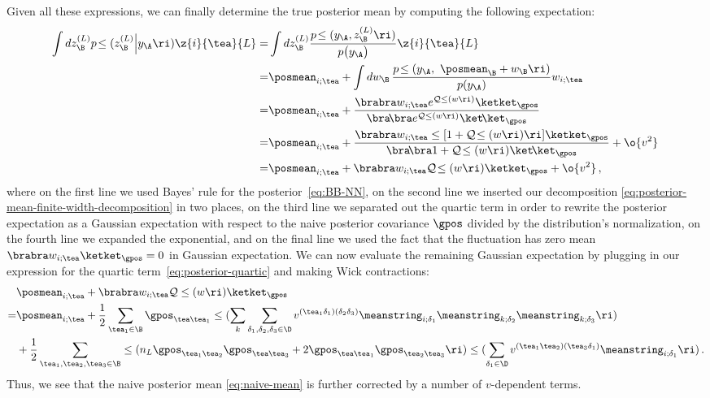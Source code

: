 Given all these expressions, we can finally determine the true posterior mean by computing the following expectation:
\begin{align}\notag
\int dz^{(L)}_{\B} p\!\le(z_{\B}^{(L)} \Big\vert y_{\A} \ri)  \z{i}{\tea}{L}=& \int dz^{(L)}_{\B} \frac{p\!\le(y_{\A},z_{\B}^{(L)} \ri)}{p\big(y_{\A} \big)} \z{i}{\tea}{L}\\
=&\posmean_{i;\tea}+\int dw_{\B}\, \frac{p\!\le(y_{\A},\ \posmean_{\B}+w_{\B} \ri)}{p(y_{\A} )} w_{i;\tea}\, \notag \\
=&\posmean_{i;\tea}+\frac{ \brabra w_{i;\tea} e^{\mathcal{Q}\le(w\ri)}\ketket_{\gpos}}{\bra\!\bra e^{\mathcal{Q}\le(w\ri)}\ket\!\ket_{\gpos}}\, \notag\\
=&\posmean_{i;\tea}+\frac{ \brabra w_{i;\tea} \le[1+\mathcal{Q}\!\le(w\ri)\ri]\ketket_{\gpos}}{\bra\!\bra 1+\mathcal{Q}\!\le(w\ri)\ket\!\ket_{\gpos}}+\o{v^2}\, \notag\\
=&\posmean_{i;\tea}+\brabra w_{i;\tea}\mathcal{Q}\!\le(w\ri)\ketket_{\gpos}+\o{v^2}\, ,
\label{eq:posterior-mean-at-finite-width}
\end{align}
where on the first line we used Bayes' rule for the posterior~\eqref{eq:BB-NN}, on the second line we inserted our decomposition \eqref{eq:posterior-mean-finite-width-decomposition} in two places, on the third line we separated out the quartic term in order to rewrite the posterior expectation as a Gaussian expectation with respect to the naive posterior covariance $\gpos$ divided by the distribution's normalization,
on the fourth line we expanded the exponential, and on the final line we used the fact that the fluctuation has zero mean $\brabra w_{i;\tea} \ketket_{\gpos}=0$ in Gaussian expectation. We can now evaluate the remaining Gaussian expectation by plugging in our expression for the quartic term~\eqref{eq:posterior-quartic} and making Wick contractions:
\begin{align}\label{eq:mean-posterior-prediction-by-exact-Bayesian-at-finite-width}
&\posmean_{i;\tea}+\brabra w_{i;\tea}\mathcal{Q}\le(w\ri)\ketket_{\gpos}\, \\
=&\posmean_{i;\tea}+\frac{1}{2}\sum_{\tea_1\in\B}\gpos_{\tea \tea_1}\le(\sum_{k}\sum_{\delta_1,\delta_2,\delta_3\in\D}v^{(\tea_1\delta_1)(\delta_2\delta_3)} \meanstring_{i;\delta_1}\meanstring_{k;\delta_2}\meanstring_{k;\delta_3}\ri)\, \notag\\
&+\frac{1}{2}\sum_{\tea_1,\tea_2,\tea_3\in\B}\le(n_{L}\gpos_{\tea_1 \tea_2}\gpos_{\tea \tea_3}+2\gpos_{\tea \tea_1}\gpos_{\tea_2 \tea_3} \ri)\le(\sum_{\delta_1\in\D}v^{(\tea_1\tea_2)(\tea_3\delta_1)} \meanstring_{i;\delta_1}\ri)\, .\notag
\end{align}
Thus, we see that the naive posterior mean \eqref{eq:naive-mean} is further corrected by a number of $v$-dependent terms.

